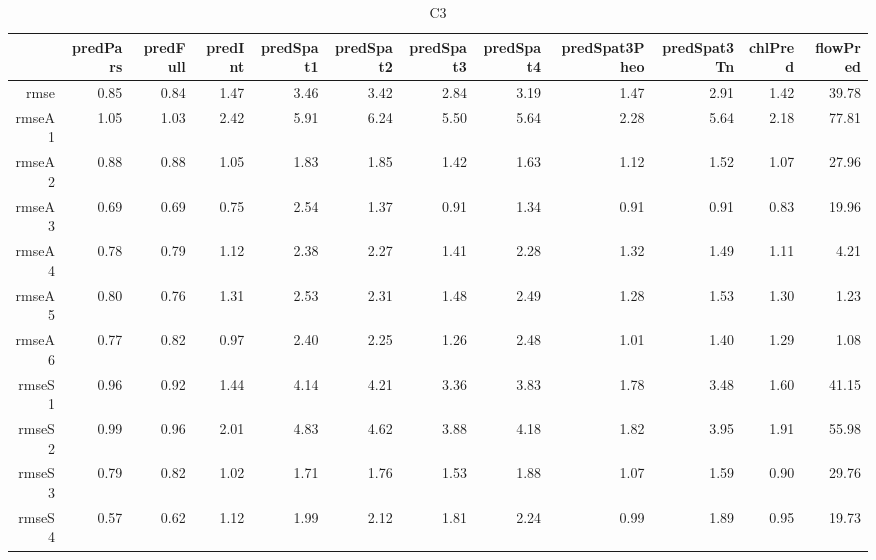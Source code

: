 \begin{table}[H]
\centering
\begingroup\fontsize{2.5pt}{4pt}\selectfont
\begin{tabular}{rrrrrrrrrrrr}
  \hline
 & predPars & predFull & predInt & predSpat1 & predSpat2 & predSpat3 & predSpat4 & predSpat3Pheo & predSpat3Tn & chlPred & flowPred \\ 
  \hline
rmse & 0.85 & 0.84 & 1.47 & 3.46 & 3.42 & 2.84 & 3.19 & 1.47 & 2.91 & 1.42 & 39.78 \\ 
  rmseA1 & 1.05 & 1.03 & 2.42 & 5.91 & 6.24 & 5.50 & 5.64 & 2.28 & 5.64 & 2.18 & 77.81 \\ 
  rmseA2 & 0.88 & 0.88 & 1.05 & 1.83 & 1.85 & 1.42 & 1.63 & 1.12 & 1.52 & 1.07 & 27.96 \\ 
  rmseA3 & 0.69 & 0.69 & 0.75 & 2.54 & 1.37 & 0.91 & 1.34 & 0.91 & 0.91 & 0.83 & 19.96 \\ 
  rmseA4 & 0.78 & 0.79 & 1.12 & 2.38 & 2.27 & 1.41 & 2.28 & 1.32 & 1.49 & 1.11 & 4.21 \\ 
  rmseA5 & 0.80 & 0.76 & 1.31 & 2.53 & 2.31 & 1.48 & 2.49 & 1.28 & 1.53 & 1.30 & 1.23 \\ 
  rmseA6 & 0.77 & 0.82 & 0.97 & 2.40 & 2.25 & 1.26 & 2.48 & 1.01 & 1.40 & 1.29 & 1.08 \\ 
  rmseS1 & 0.96 & 0.92 & 1.44 & 4.14 & 4.21 & 3.36 & 3.83 & 1.78 & 3.48 & 1.60 & 41.15 \\ 
  rmseS2 & 0.99 & 0.96 & 2.01 & 4.83 & 4.62 & 3.88 & 4.18 & 1.82 & 3.95 & 1.91 & 55.98 \\ 
  rmseS3 & 0.79 & 0.82 & 1.02 & 1.71 & 1.76 & 1.53 & 1.88 & 1.07 & 1.59 & 0.90 & 29.76 \\ 
  rmseS4 & 0.57 & 0.62 & 1.12 & 1.99 & 2.12 & 1.81 & 2.24 & 0.99 & 1.89 & 0.95 & 19.73 \\ 
   \hline
\end{tabular}
\endgroup
\caption{C3} 
\end{table}
